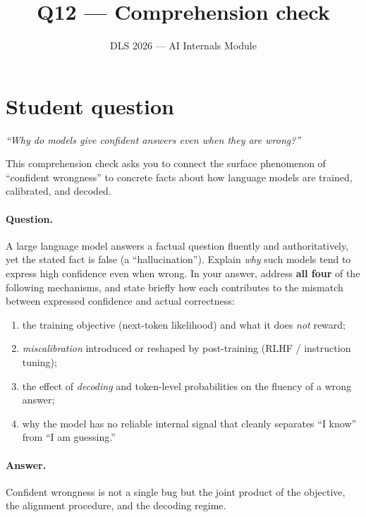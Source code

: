 \documentclass[11pt]{article}
\title{Q12 --- Comprehension check}
\author{DLS 2026 --- AI Internals Module}
\date{}
\begin{document}
\maketitle

\section*{Student question}

\emph{``Why do models give confident answers even when they are wrong?''}

This comprehension check asks you to connect the surface phenomenon of
``confident wrongness'' to concrete facts about how language models are
trained, calibrated, and decoded.

\paragraph{Question.}
A large language model answers a factual question fluently and
authoritatively, yet the stated fact is false (a ``hallucination'').
Explain \emph{why} such models tend to express high confidence even when
wrong. In your answer, address \textbf{all four} of the following
mechanisms, and state briefly how each contributes to the mismatch
between expressed confidence and actual correctness:
\begin{enumerate}[label=(\alph*)]
  \item the training objective (next-token likelihood) and what it does
        \emph{not} reward;
  \item \emph{miscalibration} introduced or reshaped by post-training
        (RLHF / instruction tuning);
  \item the effect of \emph{decoding} and token-level probabilities on
        the fluency of a wrong answer;
  \item why the model has no reliable internal signal that cleanly
        separates ``I know'' from ``I am guessing.''
\end{enumerate}

\paragraph{Answer.}
Confident wrongness is not a single bug but the joint product of the
objective, the alignment procedure, and the decoding regime.
\end{document}
